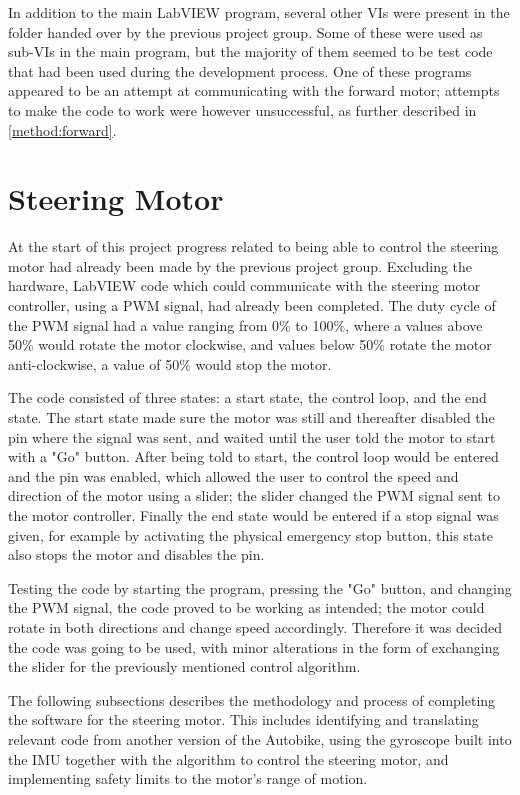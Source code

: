 In addition to the main LabVIEW program, several other VIs were present in the folder handed over by the previous project group. Some of these were used as sub-VIs in the main program, but the majority of them seemed to be test code that had been used during the development process. One of these programs appeared to be an attempt at communicating with the forward motor; attempts to make the code to work were however unsuccessful, as further described in \ref{method:forward}.

\section{Steering Motor}

At the start of this project progress related to being able to control the steering motor had already been made by the previous project group. Excluding the hardware, LabVIEW code which could communicate with the steering motor controller, using a PWM signal, had already been completed. The duty cycle of the PWM signal had a value ranging from 0\% to 100\%, where a values above 50\% would rotate the motor clockwise, and values below 50\% rotate the motor anti-clockwise, a value of 50\% would stop the motor. 

The code consisted of three states: a start state, the control loop, and the end state. The start state made sure the motor was still and thereafter disabled the pin where the signal was sent, and waited until the user told the motor to start with a "Go" button. After being told to start, the control loop would be entered and the pin was enabled, which allowed the user to control the speed and direction of the motor using a slider; the slider changed the PWM signal sent to the motor controller. Finally the end state would be entered if a stop signal was given, for example by activating the physical emergency stop button, this state also stops the motor and disables the pin.

Testing the code by starting the program, pressing the "Go" button, and changing the PWM signal, the code proved to be working as intended; the motor could rotate in both directions and change speed accordingly. Therefore it was decided the code was going to be used, with minor alterations in the form of exchanging the slider for the previously mentioned control algorithm.

The following subsections describes the methodology and process of completing the software for the steering motor. This includes identifying and translating relevant code from another version of the Autobike, using the gyroscope built into the IMU together with the algorithm to control the steering motor, and implementing safety limits to the motor's range of motion.

